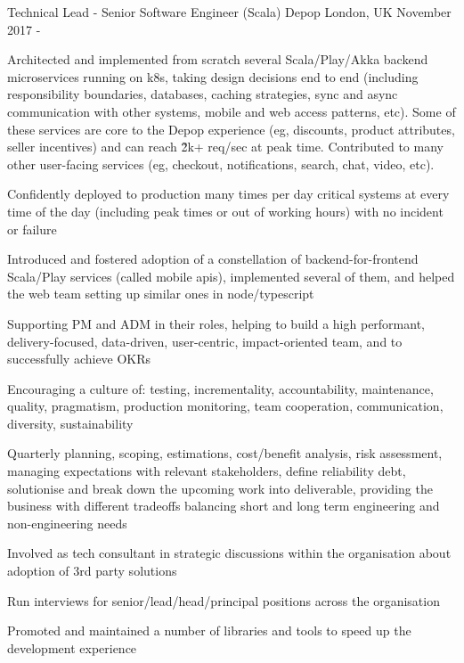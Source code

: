 \begin{cventries}
\cventry
  {Technical Lead - Senior Software Engineer (Scala)}
{Depop}
	{London, UK}
	{November 2017 - \present{}}
{%
\begin{cvitems} 
\item Architected and implemented from scratch several Scala/Play/Akka backend microservices running on k8s, taking design decisions end to end (including responsibility boundaries, databases, caching strategies, sync and async communication with other systems, mobile and web access patterns, etc). Some of these services are core to the Depop experience (eg, discounts, product attributes, seller incentives) and can reach \~ 2k+ req/sec at peak time. 
  Contributed to many other user-facing services (eg, checkout, notifications, search, chat, video, etc). 
\item Confidently deployed to production many times per day critical systems at every time of the day (including peak times or out of working hours) with no incident or failure 
  \item Introduced and fostered adoption of a constellation of backend-for-frontend Scala/Play services (called mobile apis), implemented several of them, and helped the web team setting up similar ones in node/typescript 
\item Supporting PM and ADM in their roles, helping to build a high performant, delivery-focused, data-driven, user-centric, impact-oriented team, and to successfully achieve OKRs 
  \item Encouraging a culture of: testing, incrementality, accountability, maintenance, quality, pragmatism, production monitoring, team cooperation, communication, diversity, sustainability
\item Quarterly planning, scoping, estimations, cost/benefit analysis, risk assessment, managing expectations with relevant stakeholders, define reliability debt, solutionise and break down the upcoming work into deliverable, providing the business with different tradeoffs balancing short and long term engineering and non-engineering needs 
\item Involved as tech consultant in strategic discussions within the organisation about adoption of 3rd party solutions %
  \item Run interviews for senior/lead/head/principal positions across the organisation 
  \item Promoted and maintained a number of libraries and tools to speed up the development experience %

\end{cvitems}}
\end{cventries}
